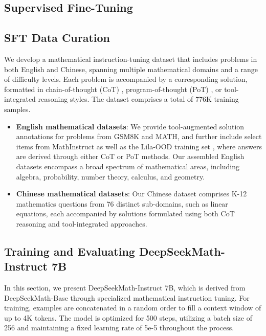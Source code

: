 \begin{itemize}[topsep=0pt]
\section{Supervised Fine-Tuning}

\subsection{SFT Data Curation}

We develop a mathematical instruction-tuning dataset that includes problems in both English and Chinese, spanning multiple mathematical domains and a range of difficulty levels. Each problem is accompanied by a corresponding solution, formatted in chain-of-thought (CoT) \citep{cot}, program-of-thought (PoT) \citep{pot,pal}, or tool-integrated reasoning \citep{tora} styles. The dataset comprises a total of 776K training samples.

\begin{itemize}[topsep=0pt]
    \item \textbf{English mathematical datasets}: We provide tool-augmented solution annotations for problems from GSM8K and MATH, and further include select items from MathInstruct \citep{MathInstruct} as well as the Lila-OOD training set \citep{lila}, where answers are derived through either CoT or PoT methods. Our assembled English datasets encompass a broad spectrum of mathematical areas, including algebra, probability, number theory, calculus, and geometry.
    \item \textbf{Chinese mathematical datasets}: Our Chinese dataset comprises K-12 mathematics questions from 76 distinct sub-domains, such as linear equations, each accompanied by solutions formulated using both CoT reasoning and tool-integrated approaches.
\end{itemize}

\subsection{Training and Evaluating DeepSeekMath-Instruct 7B}

In this section, we present DeepSeekMath-Instruct 7B, which is derived from DeepSeekMath-Base through specialized mathematical instruction tuning. For training, examples are concatenated in a random order to fill a context window of up to 4K tokens. The model is optimized for 500 steps, utilizing a batch size of 256 and maintaining a fixed learning rate of 5e-5 throughout the process.


\end{itemize}
